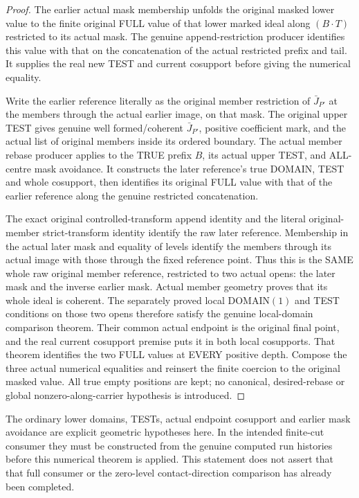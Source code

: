 \begin{proof}
The earlier actual mask membership unfolds the original masked lower
value to the finite original FULL value of that lower marked ideal along
$(B\mathbin{\cdot}T)$ restricted to its actual mask. The genuine
append-restriction producer identifies this value with that on the
concatenation of the actual restricted prefix and tail. It supplies the
real new TEST and current cosupport before giving the numerical equality.

Write the earlier reference literally as the original member restriction
of $\bar J_{P'}$ at the members through the actual earlier image, on that
mask. The original upper TEST gives genuine well formed/coherent
$\bar J_{P'}$, positive coefficient mark, and the actual list of original
members inside its ordered boundary. The actual member rebase producer
applies to the TRUE prefix $B$, its actual upper TEST, and ALL-centre mask
avoidance. It constructs the later reference's true DOMAIN, TEST and whole
cosupport, then identifies its original FULL value with that of the
earlier reference along the genuine restricted concatenation.

The exact original controlled-transform append identity and the literal
original-member strict-transform identity identify the raw later
reference. Membership in the actual later mask and equality of levels
identify the members through its actual image with those through the
fixed reference point. Thus this is the SAME whole raw original member
reference, restricted to two actual opens: the later mask and the inverse
earlier mask. Actual member geometry proves that its whole ideal is
coherent. The separately proved local DOMAIN$(1)$ and TEST conditions on
those two opens therefore satisfy the genuine local-domain comparison
theorem. Their common actual endpoint is the original final point, and
the real current cosupport premise puts it in both local cosupports.
That theorem identifies the two FULL values at EVERY positive depth.
Compose the three actual numerical equalities and reinsert the finite
coercion to the original masked value. All true empty positions are kept;
no canonical, desired-rebase or global nonzero-along-carrier hypothesis is
introduced.
\end{proof}

The ordinary lower domains, TESTs, actual endpoint cosupport and earlier
mask avoidance are explicit geometric hypotheses here. In the intended
finite-cut consumer they must be constructed from the genuine computed
run histories before this numerical theorem is applied. This statement
does not assert that that full consumer or the zero-level contact-direction
comparison has already been completed.
